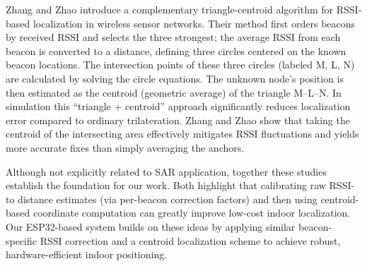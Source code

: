 Zhang and Zhao \cite{WSNCentroid} introduce a complementary triangle-centroid algorithm for RSSI-based localization in wireless sensor networks. Their method first orders beacons by received RSSI and selects the three strongest; the average RSSI from each beacon is converted to a distance, defining three circles centered on the known beacon locations. The intersection points of these three circles (labeled M, L, N) are calculated by solving the circle equations. The unknown node’s position is then estimated as the centroid (geometric average) of the triangle M–L–N. In simulation this “triangle + centroid” approach significantly reduces localization error compared to ordinary trilateration. Zhang and Zhao show that taking the centroid of the intersecting area effectively mitigates RSSI fluctuations and yields more accurate fixes than simply averaging the anchors.

Although not explicitly related to SAR application, together these studies establish the foundation for our work. Both highlight that calibrating raw RSSI-to distance estimates (via per-beacon correction factors) and then using centroid-based coordinate computation can greatly improve low-cost indoor localization. Our ESP32-based system builds on these ideas by applying similar beacon-specific RSSI correction and a centroid localization scheme to achieve robust, hardware-efficient indoor positioning.